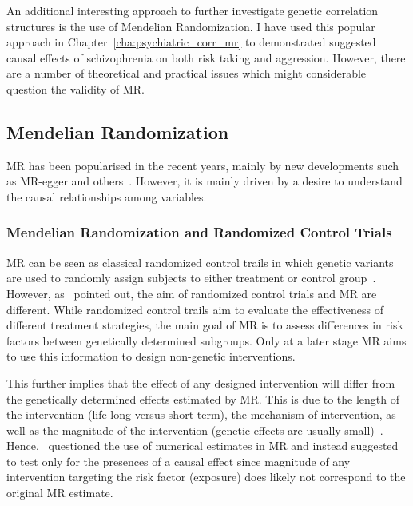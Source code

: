 An additional interesting approach to further investigate genetic correlation structures is the use of Mendelian Randomization.
I have used this popular approach in Chapter~\ref{cha:psychiatric_corr_mr} to demonstrated suggested causal effects of schizophrenia on both risk taking and aggression.
However, there are a number of theoretical and practical issues which might considerable question the validity of MR\@.

\subsection{Mendelian Randomization}
\label{sub:mendelian_randomization_discussion}

MR has been popularised in the recent years, mainly by new developments such as MR-egger and others~\cite{Bowden2015}.
However, it is mainly driven by a desire to understand the causal relationships among variables.

\subsubsection{Mendelian Randomization and Randomized Control Trials}
\label{ssub:causality_and_mendelian_randomization}

MR can be seen as classical randomized control trails in which genetic variants are used to randomly assign subjects to either treatment or control group~\cite{Hingorani2005}.
However, as~\citet{Burgess2016a} pointed out, the aim of randomized control trials and MR are different.
While randomized control trails aim to evaluate the effectiveness of different treatment strategies, the main goal of MR is to assess differences in risk factors between genetically determined subgroups.   
Only at a later stage MR aims to use this information to design non-genetic interventions.

This further implies that the effect of any designed intervention will differ from the genetically determined effects estimated by MR\@.
This is due to the length of the intervention (life long versus short term), the mechanism of intervention, as well as the magnitude of the intervention (genetic effects are usually small)~\cite{Evans2015}. 
Hence,~\citet{Vanderweele2015} questioned the use of  numerical estimates in MR and instead suggested to test only for the presences of a causal effect since magnitude of any intervention targeting the risk factor (exposure) does likely not correspond to the original MR estimate.


